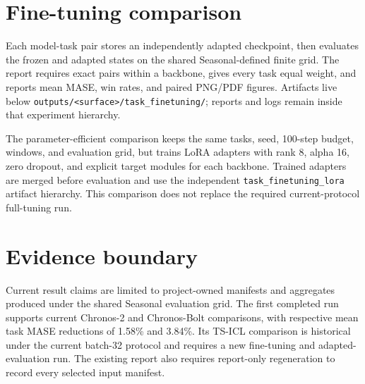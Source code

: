 \documentclass[10pt]{article}
\begin{document}
\section{Fine-tuning comparison}

Each model-task pair stores an independently adapted checkpoint, then evaluates
the frozen and adapted states on the shared Seasonal-defined finite grid. The
report requires exact pairs within a backbone, gives every task equal weight,
and reports mean MASE, win rates, and paired PNG/PDF figures. Artifacts live
below \nolinkurl{outputs/<surface>/task_finetuning/}; reports and logs remain
inside that experiment hierarchy.

The parameter-efficient comparison keeps the same tasks, seed, 100-step
budget, windows, and evaluation grid, but trains LoRA adapters with rank 8,
alpha 16, zero dropout, and explicit target modules for each backbone. Trained
adapters are merged before evaluation and use the independent
\nolinkurl{task_finetuning_lora} artifact hierarchy. This comparison does not
replace the required current-protocol full-tuning run.

\section{Evidence boundary}

Current result claims are limited to project-owned manifests and aggregates
produced under the shared Seasonal evaluation grid. The first completed run
supports current Chronos-2 and Chronos-Bolt comparisons, with respective mean
task MASE reductions of 1.58\% and 3.84\%. Its TS-ICL comparison is historical
under the current batch-32 protocol and requires a new fine-tuning and adapted-
evaluation run. The existing report also requires report-only regeneration to
record every selected input manifest.
\end{document}
